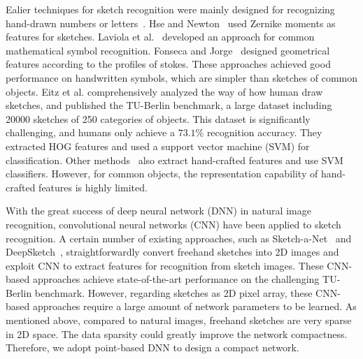 %
Ealier techniques for sketch recognition were mainly designed for recognizing hand-drawn numbers or letters~\cite{Hse2004SketchedSR, LaViola2004MathPad2AS, Fonseca2000UsingFL}.
Hse and Newton~\cite{Hse2004SketchedSR} used Zernike moments as features for sketches.
Laviola et al.~\cite{LaViola2004MathPad2AS} developed an approach for common mathematical symbol recognition.
Fonseca and Jorge~\cite{Fonseca2000UsingFL} designed geometrical features according to the profiles of stokes.
These approaches achieved good performance on handwritten symbols, which are simpler than sketches of common objects.
%
Eitz et al. \cite{Eitz2012HowDH} comprehensively analyzed the way of how human draw sketches, and published the TU-Berlin benchmark, a large dataset including 20000 sketches of 250 categories of objects. 
This dataset is significantly challenging, and humans only achieve a $73.1\%$ recognition accuracy.
%
They extracted HOG features and used a support vector machine (SVM) for classification.
Other methods~\cite{LiHSG15, Schneider2014SketchCA} also extract hand-crafted features and use SVM classifiers.
However, for common objects, the representation capability of hand-crafted features is highly limited.

 

With the great success of deep neural network (DNN) in natural image recognition, convolutional neural networks (CNN) have been applied to sketch recognition.
A certain number of existing approaches, such as Sketch-a-Net~\cite{Yu2015SketchaNetTB} and DeepSketch~\cite{Seddati2015DeepSketchDC}, 
straightforwardly convert freehand sketches into 2D images and exploit CNN to extract features for recognition from sketch images. 
These CNN-based approaches achieve state-of-the-art performance on the challenging TU-Berlin benchmark.
However, regarding sketches as 2D pixel array, these CNN-based approaches require a large amount of network parameters to be learned.
%
As mentioned above, compared to natural images, freehand sketches are very sparse in 2D space. The data sparsity could greatly improve the network compactness. 
Therefore, we adopt point-based DNN to design a compact network. 

